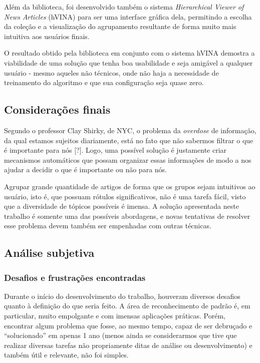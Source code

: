 \documentclass[a4paper,12pt]{article}
\begin{document}
Além da biblioteca, foi desenvolvido também o sistema \textit{Hierarchical Viewer of News Articles} (hVINA) para ser uma interface gráfica dela, permitindo a escolha da coleção e a visualização do agrupamento resultante de forma muito mais intuitiva aos usuários finais.

O resultado obtido pela biblioteca em conjunto com o sistema hVINA demostra a viabilidade de uma solução que tenha boa usabilidade e seja amigável a qualquer usuário - mesmo aqueles não técnicos, onde não haja a necessidade de treinamento do algoritmo e que sua configuração seja quase zero.

\subsection {Considerações finais}
\label {sec:consideracoes_finais}

Segundo o professor Clay Shirky, de NYC, o problema da \textit{overdose} de informação, da qual estamos sujeitos diariamente, está no fato que não sabermos filtrar o que é importante para nós [?]. Logo, uma possível solução é justamente criar mecanismos automáticos que possam organizar essas informações de modo a nos ajudar a decidir o que é importante ou não para nós.

Agrupar grande quantidade de artigos de forma que os grupos sejam intuitivos ao usuário, isto é, que possuam rótulos significativos, não é uma tarefa fácil, visto que a diversidade de tópicos possíveis é imensa. A solução apresentada neste trabalho é somente uma das possíveis abordagens, e novas tentativas de resolver esse problema devem também ser empenhadas com outras técnicas.

\subsection {Análise subjetiva}
\label {sec:analise_subjetiva}

\subsubsection {Desafios e frustrações encontradas}
\label {sec:desafios_frustracoes_encontradas}

Durante o início do desenvolvimento do trabalho, houveram diversos desafios quanto à definição do que seria feito. A área de reconhecimento de padrão é, em particular, muito empolgante e com imensas aplicações práticas. Porém, encontrar algum problema que fosse, ao mesmo tempo, capaz de ser debruçado e “solucionado” em apenas 1 ano (menos ainda se considerarmos que tive que realizar diversas tarefas não propriamente ditas de análise ou desenvolvimento) e também útil e relevante, não foi simples.
\end{document}
